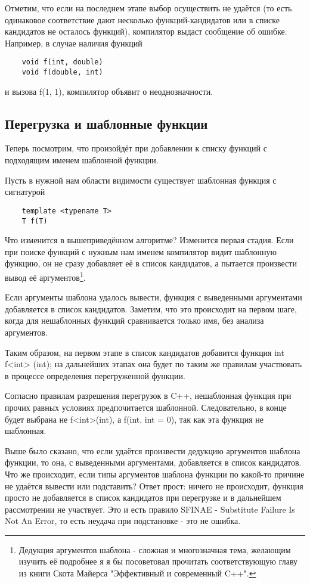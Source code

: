 	Отметим, что если на последнем этапе выбор осуществить не удаётся (то есть одинаковое соответствие дают несколько функций-кандидатов или в списке кандидатов не осталось функций), компилятор выдаст сообщение об ошибке. Например, в случае наличия функций
	
	\begin{verbatim}
	void f(int, double)
	void f(double, int)
	\end{verbatim}
	
	и вызова f(1, 1), компилятор объявит о неоднозначности.

\subsection{Перегрузка и шаблонные функции}
	Теперь посмотрим, что произойдёт при добавлении к списку функций с подходящим именем шаблонной функции.

	Пусть в нужной нам области видимости существует шаблонная функция с сигнатурой
	
	\begin{verbatim}
	template <typename T>
	T f(T)
	\end{verbatim}
	
	Что изменится в вышеприведённом алгоритме? Изменится первая стадия. Если при поиске функций с нужным нам именем компилятор видит шаблонную функцию, он не сразу добавляет её в список кандидатов, а пытается произвести вывод её аргументов\footnote{%
	Дедукция аргументов шаблона - сложная и многозначная тема, желающим изучить её подробнее я я бы посоветовал прочитать соответствующую главу из книги Скота Майерса "Эффективный и современный C++".}.
	
	Если аргументы шаблона удалось вывести, функция с выведенными аргументами добавляется в список кандидатов. Заметим, что это происходит на первом шаге, когда для нешаблонных функций сравнивается только имя, без анализа аргументов.
	
	Таким образом, на первом этапе в список кандидатов добавится функция int f<int> (int); на дальнейших этапах она будет по таким же правилам участвовать в процессе определения перегруженной функции. 
	
	Согласно правилам разрешения перегрузок в C++, нешаблонная функция при прочих равных условиях предпочитается шаблонной. Следовательно, в конце будет выбрана не f<int>(int), а f(int, int = 0), так как эта функция не шаблонная.
	
	Выше было сказано, что если удаётся произвести дедукцию аргументов шаблона функции, то она, с выведенными аргументами, добавляется в список кандидатов. Что же происходит, если типы аргументов шаблона функции по какой-то причине не удаётся вывести или подставить? Ответ прост: ничего не происходит, функция просто не добавляется в список кандидатов при перегрузке и в дальнейшем рассмотрении не участвует. Это и есть правило SFINAE - Substitute Failure Is Not An Error, то есть неудача при подстановке - это не ошибка.
	
